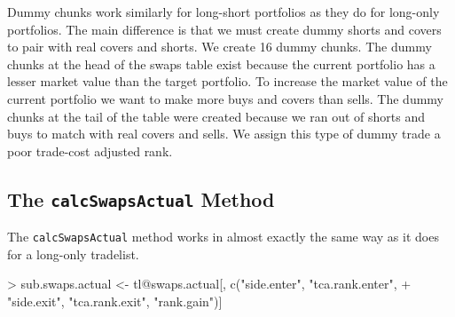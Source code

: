 \documentclass{article}
\begin{document}
Dummy chunks work similarly for long-short portfolios as they do for
long-only portfolios.  The main difference is that we must create
dummy shorts and covers to pair with real covers and shorts.  We
create 16 dummy chunks.
The dummy chunks at the head of the swaps table exist because the
current portfolio has a lesser market value than the target portfolio.
To increase the market value of the current portfolio we want to make
more buys and covers than sells.  The dummy chunks at the tail of the
table were created because we ran out of shorts and buys to match with
real covers and sells.  We assign this type of dummy trade a poor
trade-cost adjusted rank.

\subsection{The \texttt{calcSwapsActual} Method}

The \texttt{calcSwapsActual} method works in almost exactly the same
way as it does for a long-only tradelist.

\begin{Schunk}
\begin{Sinput}
> sub.swaps.actual <- tl@swaps.actual[, c("side.enter", "tca.rank.enter", 
+     "side.exit", "tca.rank.exit", "rank.gain")]
\end{Sinput}
\end{Schunk}
\end{document}

